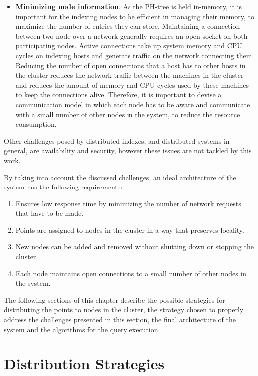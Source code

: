\documentclass[11pt,a4paper]{globis-book}
\begin{document}
\begin{itemize}
    \item \textbf{Minimizing node information}. As the PH-tree is held in-memory, it is important for the indexing nodes to be efficient in managing their memory, to maximize the number of entries they can store. Maintaining a connection between two node over a network generally requires an open socket on both participating nodes. Active connections take up system memory and CPU cycles on indexing hosts and generate traffic on the network connecting them. Reducing the number of open connections that a host has to other hosts in the cluster reduces the network traffic between the machines in the cluster and reduces the amount of memory and CPU cycles used by these machines to keep the connections alive. Therefore, it is important to devise a communication model in which each node has to be aware and communicate with a small number of other nodes in the system, to reduce the resource consumption.
\end{itemize}

Other challenges posed by distributed indexes, and distributed systems in general, are availability and security, however these issues are not tackled by this work.

By taking into account the discussed challenges, an ideal architecture of the system has the following requirements:
\begin{enumerate}
    \item Ensures low response time by minimizing the number of network requests that have to be made.        
    \item Points are assigned to nodes in the cluster in a way that preserves locality.
    \item New nodes can be added and removed without shutting down or stopping the cluster.
    \item Each node maintains open connections to a small number of other nodes in the system.
\end{enumerate}

The following sections of this chapter describe the possible strategies for distributing the points to nodes in the cluster, the strategy chosen to properly address the challenges presented in this section, the final architecture of the system and the algorithms for the query execution.

\section{Distribution Strategies}
\label{sec:distindex-strategies}
\end{document}
